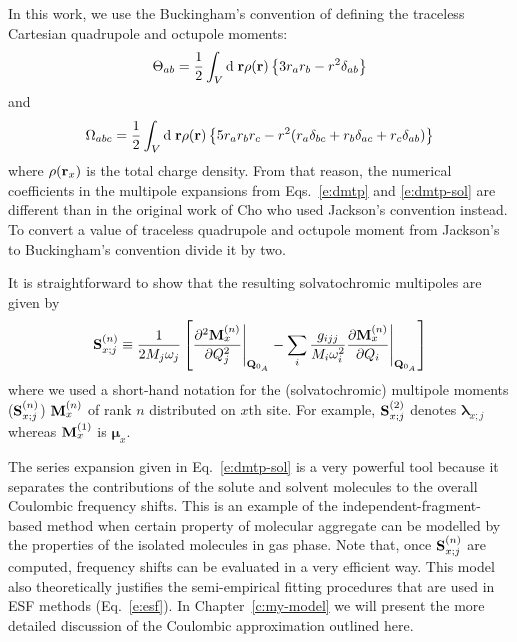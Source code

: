 \documentclass[a4paper,titlepage,twoside,fleqn,12pt]{book}
\newcommand{\BM}[1]{\bm{#1}}
\begin{document}
\begin{refsection}
In this work, we use the Buckingham's convention of defining the traceless Cartesian
quadrupole and octupole moments: \citep{Buckingham.QRevChemSoc.1959} 
%
\begin{equation} \label{e:quad-trac}
\Theta_{ab} = \frac{1}{2} \int_V {\rm d}\;{\bf r} \rho({\bf r}) \left\{ 3r_ar_b-r^2 \delta_{ab}\right\}
\end{equation}
%
and 
%
\begin{equation} \label{e:oct-trac}
\Omega_{abc} = \frac{1}{2} \int_V {\rm d}\;{\bf r} \rho({\bf r}) \left\{ 5r_ar_br_c-r^2(r_a\delta_{bc}+
                                                                     r_b\delta_{ac}+
                                                                     r_c\delta_{ab})\right\}
\end{equation}
%
where $\rho({\bf r}_x)$ is the total charge density.
From that reason, the numerical coefficients in the multipole expansions 
from Eqs.~\eqref{e:dmtp} and \eqref{e:dmtp-sol}
are different than in the original work of Cho \citep{Cho.JCP.2009} who used 
Jackson's convention instead. \citep{Jackson.ClassicalElectrodynamics.1998} 
To convert a value of traceless
quadrupole and octupole moment from Jackson's to Buckingham's convention
divide it by two.

It is straightforward to show that the resulting solvatochromic multipoles
are given by
%
\begin{equation} \label{e:solvatochromic-multipoles}
 {\bf S}^{(n)}_{x;j} \equiv \frac{1}{2M_j\omega_j} \left[ 
     \frac{\partial^2 {\bf M}^{(n)}_{x} }{\partial Q_j^2} \Bigg|_{{\bf Q}_{0_A}}
-
\sum_i \frac{g_{ijj}}{M_i\omega_i^2} 
\frac{\partial {\bf M}^{(n)}_{x} }{\partial Q_i} \Bigg|_{{\bf Q}_{0_A}}
\right]
\end{equation}
%
where we used a short\hyp{}hand notation for the (solvatochromic) multipole moments
(${\bf S}^{(n)}_{x;j}$) ${\bf M}^{(n)}_{x}$
of rank $n$ distributed on $x$th site. For example, ${\bf S}^{(2)}_{x;j}$
denotes ${\BM \lambda}_{x;j}$ whereas ${\bf M}^{(1)}_{x}$ is ${\BM \mu}_x$.

The series expansion given in Eq.~\eqref{e:dmtp-sol} is a very powerful tool because
it separates the contributions of the solute and solvent molecules to the overall Coulombic
frequency shifts. This is an example of the independent-fragment-based method
when certain property of molecular aggregate can be modelled by the properties
of the isolated molecules in gas phase. Note that, once ${\bf S}^{(n)}_{x;j}$
are computed, frequency shifts can be evaluated in a very efficient way.
This model also theoretically justifies the semi\hyp{}empirical fitting procedures 
that are used in ESF methods (Eq.~\eqref{e:esf}).
In Chapter~\ref{c:my-model} we will present the more detailed discussion of the Coulombic
approximation outlined here.



\end{refsection}
\end{document}
